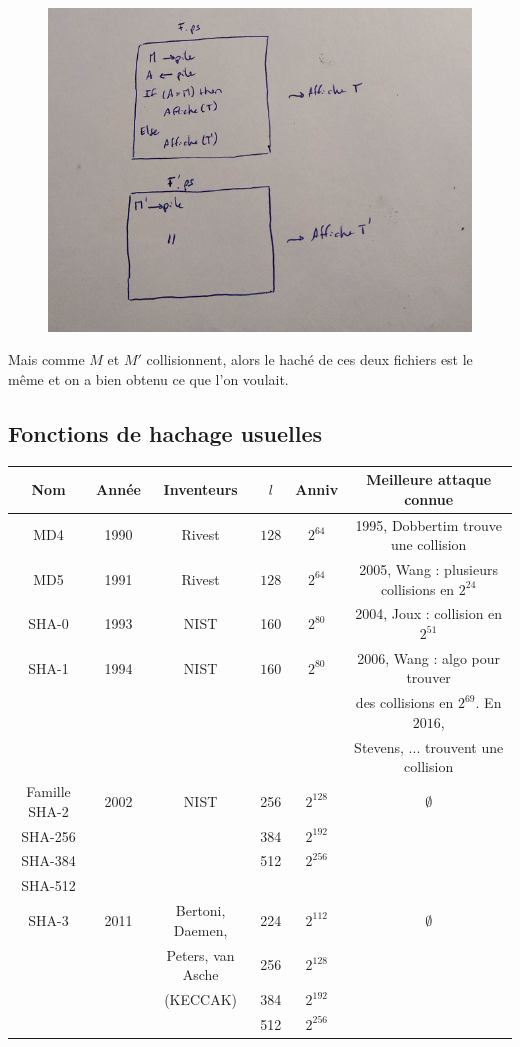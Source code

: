                 \begin{figure}[H]
                    \centering
                    \includegraphics[width=.7\textwidth]{pictures/07}
                \end{figure} \noindent
                
                Mais comme $M$ et $M'$ collisionnent, alors le haché de ces deux fichiers est le même et on a bien obtenu ce que l'on voulait.

        \subsection{Fonctions de hachage usuelles}
            \begin{tabular}{c|c|c|c|c|c}
                Nom & Année & Inventeurs & $l$ & Anniv & Meilleure attaque connue \\
                \hline
                MD4 & 1990 & Rivest & $128$ & $2^{64}$ & 1995, Dobbertim trouve une collision \\
                \hline
                MD5 & 1991 & Rivest & $128$ & $2^{64}$ & 2005, Wang : plusieurs collisions en $2^{24}$\\
                \hline
                SHA{\color{blue}-0} & 1993 & NIST & 160 & $2^{80}$ & 2004, Joux : collision en $2^{51}$ \\
                \hline
                SHA-1& 1994 & NIST & $160$ & $2^{80}$ & 2006, Wang : algo pour trouver \\
                &&&&& des collisions en $2^{69}$. En $2016$, \\
                &&&&& Stevens, ... trouvent une collision \\
                \hline
                {\color{blue} Famille SHA-2}& 2002 & NIST & 256 & $2^{128}$ & $\emptyset$ \\
                SHA-256 &&& 384 & $2^{192}$& \\
                SHA-384 &&& 512 & $2^{256}$& \\
                SHA-512 &&&&& \\
                \hline
                SHA-3 & 2011 & Bertoni, Daemen, & 224 & $2^{112}$ & $\emptyset$ \\
                && Peters, van Asche & 256 & $2^{128}$ &\\
                && (KECCAK) & 384 & $2^{192}$ &\\
                &&& 512 & $2^{256}$ &\\
            \end{tabular}


